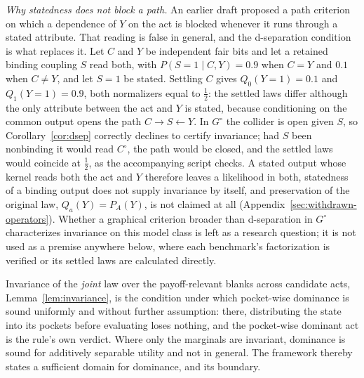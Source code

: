 \noindent\emph{Why statedness does not block a path.} An earlier draft proposed a path criterion on which a dependence of $Y$ on the act is blocked whenever it runs through a stated attribute. That reading is false in general, and the d-separation condition is what replaces it. Let $C$ and $Y$ be independent fair bits and let a retained binding coupling $S$ read both, with $P(S = 1 \mid C, Y) = 0.9$ when $C = Y$ and $0.1$ when $C \ne Y$, and let $S = 1$ be stated. Settling $C$ gives $Q_0(Y = 1) = 0.1$ and $Q_1(Y = 1) = 0.9$, both normalizers equal to $\tfrac12$: the settled laws differ although the only attribute between the act and $Y$ is stated, because conditioning on the common output opens the path $C \to S \leftarrow Y$. In $G^{\circ}$ the collider is open given $S$, so Corollary~\ref{cor:dsep} correctly declines to certify invariance; had $S$ been nonbinding it would read $C^{\circ}$, the path would be closed, and the settled laws would coincide at $\tfrac12$, as the accompanying script checks. A stated output whose kernel reads both the act and $Y$ therefore leaves a likelihood in both, statedness of a binding output does not supply invariance by itself, and preservation of the original law, $Q_a(Y) = P_A(Y)$, is not claimed at all (Appendix~\ref{sec:withdrawn-operators}). Whether a graphical criterion broader than d-separation in $G^{\circ}$ characterizes invariance on this model class is left as a research question; it is not used as a premise anywhere below, where each benchmark's factorization is verified or its settled laws are calculated directly.

\begin{proposition}
\label{prop:dominance}
Invariance of the \emph{joint} law over the payoff-relevant blanks across candidate acts, Lemma~\ref{lem:invariance}, is the condition under which pocket-wise dominance is sound uniformly and without further assumption: there, distributing the state into its pockets before evaluating loses nothing, and the pocket-wise dominant act is the rule's own verdict. Where only the marginals are invariant, dominance is sound for additively separable utility and not in general. The framework thereby states a sufficient domain for dominance, and its boundary.
\end{proposition}


